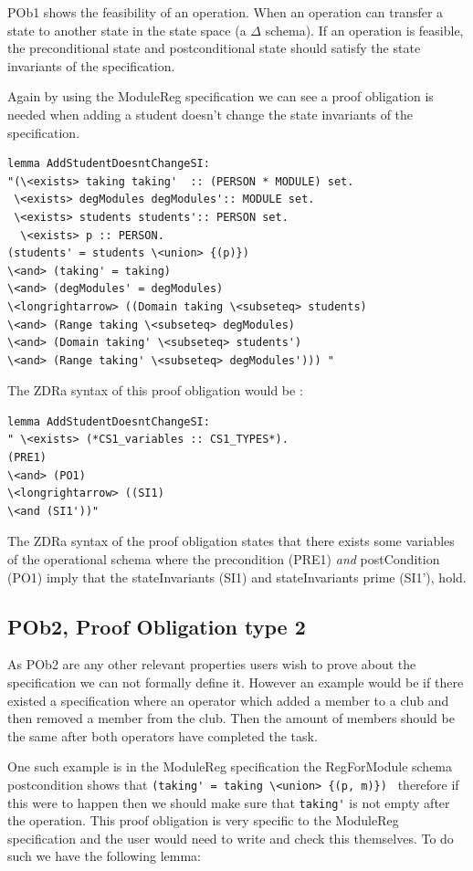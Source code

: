 POb1 shows the feasibility of an operation. When an operation can transfer a
state to another state in the state space (a $\Delta$ schema). If an operation
is feasible, the preconditional state and postconditional state should satisfy
the state invariants of the specification.

Again by using the ModuleReg specification we can see a proof obligation is
needed when adding a student doesn't change the state invariants of the
specification.

\begin{verbatim}
lemma AddStudentDoesntChangeSI:
"(\<exists> taking taking'  :: (PERSON * MODULE) set.
 \<exists> degModules degModules':: MODULE set.
 \<exists> students students':: PERSON set.
  \<exists> p :: PERSON.
(students' = students \<union> {(p)}) 
\<and> (taking' = taking)
\<and> (degModules' = degModules)
\<longrightarrow> ((Domain taking \<subseteq> students)
\<and> (Range taking \<subseteq> degModules)
\<and> (Domain taking' \<subseteq> students')
\<and> (Range taking' \<subseteq> degModules'))) "
\end{verbatim}

The ZDRa syntax of this proof obligation would be :

\begin{verbatim}
lemma AddStudentDoesntChangeSI:
" \<exists> (*CS1_variables :: CS1_TYPES*).
(PRE1)
\<and> (PO1)
\<longrightarrow> ((SI1)
\<and (SI1'))"
\end{verbatim}

 The ZDRa syntax of the proof obligation states that there exists some variables
 of the operational schema where the precondition (PRE1) \emph{and}
 postCondition (PO1) imply that the stateInvariants (SI1) and stateInvariants
 prime (SI1'), hold.

\subsection{POb2, Proof Obligation type 2}

As POb2 are any other relevant properties users wish to prove about the
specification we can not formally define it. However an example would be if
there existed a specification where an operator which added a member to a club
and then removed a member from the club. Then the amount of members should be
the same after both operators have completed the task.

One such example is in the ModuleReg specification the RegForModule schema
postcondition shows that \verb|(taking' = taking \<union> {(p, m)}) | therefore if this
were to happen then we should make sure that \verb|taking'| is not empty after
the operation. This proof obligation is very specific to the ModuleReg
specification and the user would need to write and check this themselves. To do
such we have the following lemma:

